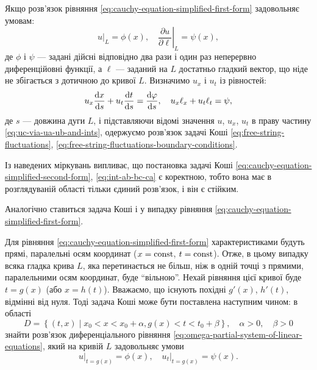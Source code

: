 Якщо розв'язок рівняння \eqref{eq:cauchy-equation-simplified-first-form} задовольняє умовам:
\begin{equation}
    \label{eq:free-string-fluctuations-boundary-conditions}
    \left. u \right|_L = \phi(x), \quad \left. \frac{\partial u}{\partial \ell} \right|_L = \psi(x),
\end{equation}
де $\phi$ і $\psi$ --- задані дійсні відповідно два рази і один раз неперервно диференційовні функції, а $\ell$ --- заданий на $L$ достатньо гладкий вектор, що ніде не збігається з дотичною до кривої $L$. Визначимо $u_x$ і $u_t$ із рівностей:
\begin{equation}
    u_x \frac{\mathop{}\!\mathrm{d} x}{\mathop{}\!\mathrm{d} s} + u_t \frac{\mathop{}\!\mathrm{d} t}{\mathop{}\!\mathrm{d} s} = \frac{\mathop{}\!\mathrm{d} \varphi}{\mathop{}\!\mathrm{d} s}, \quad u_x \ell_x + u_t \ell_t = \psi,
\end{equation}
де $s$ --- довжина дуги $L$, і підставляючи відомі значення $u$, $u_x$, $u_t$ в праву частину \eqref{eq:uc-via-ua-ub-and-ints}, одержуємо розв'язок задачі Коші \eqref{eq:free-string-fluctuations}, \eqref{eq:free-string-fluctuations-boundary-conditions}. \medskip

Із наведених міркувань випливає, що постановка задачі Коші \eqref{eq:cauchy-equation-simplified-second-form}, \eqref{eq:int-ab-bc-ca} є коректною, тобто вона має в розглядуваній області тільки єдиний розв'язок, і він є стійким. \medskip

Аналогічно ставиться задача Коші і у випадку рівняння \eqref{eq:cauchy-equation-simplified-first-form}. \medskip

Для рівняння \eqref{eq:cauchy-equation-simplified-first-form} характеристиками будуть прямі, паралельні осям координат ($x = \operatorname{const}$, $t = \operatorname{const}$). Отже, в цьому випадку всяка гладка крива $L$, яка перетинається не більш, ніж в одній точці з прямими, паралельними осям координат, буде ``вільною''. Нехай рівняння цієї кривої буде $t = g(x)$ (або $x = h(t)$). Вважаємо, що існують похідні $g'(x)$, $h'(t)$, відмінні від нуля. Тоді задача Коші може бути поставлена наступним чином: в області
\begin{equation}
    D = \left\{ (t, x) \middle| x_0 < x < x_0 + \alpha, g(x) < t < t_0 + \beta \right\}, \quad \alpha > 0, \quad \beta > 0
\end{equation}
знайти розв'язок диференціального рівняння \eqref{eq:omega-partial-system-of-linear-equations}, який на кривій $L$ задовольняє умови
\begin{equation}
    \label{eq:second-form-boundary-conditions}
    \left. u \right|_{t = g(x)} = \phi(x), \quad \left. u_t \right|_{t = g(x)} = \psi(x).
\end{equation}

